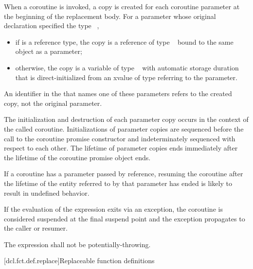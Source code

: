 \pnum
When a coroutine is invoked,
a copy is created for each coroutine parameter
at the beginning of the replacement body.
For a parameter
whose original declaration specified the type \cv{}~,
\begin{itemize}
\item
if  is a reference type,
the copy is a reference of type
\cv{}~
bound to the same object as a parameter;
\item
otherwise, the copy is a variable
of type \cv{}~
with automatic storage duration that is direct-initialized
from an xvalue of type  referring to the parameter.
\end{itemize}
\begin{note}
An identifier in the 
that names one of these parameters
refers to the created copy,
not the original parameter.
\end{note}

The initialization and destruction of each parameter copy occurs in the
context of the called coroutine.
Initializations of parameter copies are sequenced before the call to the
coroutine promise constructor and indeterminately sequenced with respect to
each other.
The lifetime of parameter copies ends immediately after the lifetime of the
coroutine promise object ends.
\begin{note}
If a coroutine has a parameter passed by reference, resuming the coroutine
after the lifetime of the entity referred to by that parameter has ended is
likely to result in undefined behavior.
\end{note}

\pnum
If the evaluation of the expression
 exits via an exception,
the coroutine is considered suspended at the final suspend point
and the exception propagates to the caller or resumer.

\pnum
The expression  
shall not be potentially-throwing.

[dcl.fct.def.replace]{Replaceable function definitions}

%
%

